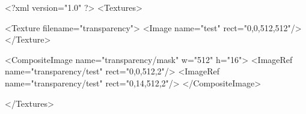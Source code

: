 <?xml version="1.0" ?>
<Textures>

	<Texture filename="transparency">
		<Image name="test" rect="0,0,512,512"/>
	</Texture>

	<CompositeImage name="transparency/mask" w="512" h="16">
		<ImageRef name="transparency/test" rect="0,0,512,2"/>
		<ImageRef name="transparency/test" rect="0,14,512,2"/>
	</CompositeImage>
	
</Textures>
